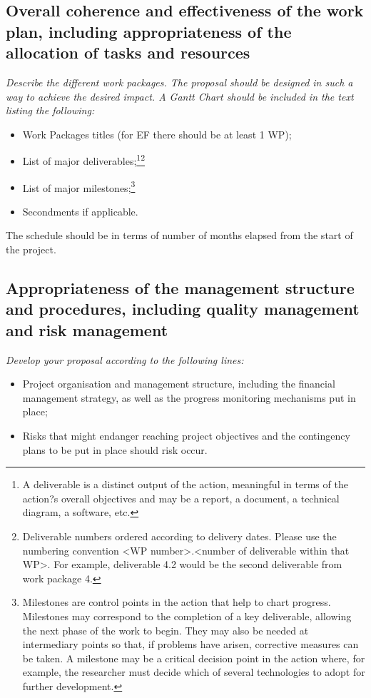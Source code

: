 \documentclass[a4paper,11pt]{article}
\begin{document}
\subsection{Overall coherence and effectiveness of the work plan, including appropriateness of the allocation of tasks and resources}

{\em
Describe the different work packages. The proposal should be designed in such a way to achieve the desired impact. A Gantt Chart should be included in the text listing the following:
\begin{itemize}
\item Work Packages titles (for EF there should be at least 1 WP);
\item List of major deliverables;\footnote{A deliverable is a distinct output of the action, meaningful in terms of the action?s overall objectives and may be a report, a document, a technical diagram, a software, etc.}\footnote{Deliverable numbers ordered according to delivery dates. Please use the numbering convention <WP number>.<number of deliverable within that WP>. For example, deliverable 4.2 would be the second deliverable from work package 4.}
\item List of major milestones;\footnote{Milestones are control points in the action that help to chart progress. Milestones may correspond to the completion of a key deliverable, allowing the next phase of the work to begin. They may also be needed at intermediary points so that, if problems have arisen, corrective measures can be taken. A milestone may be a critical decision point in the action where, for example, the researcher must decide which of several technologies to adopt for further development.}
\item Secondments if applicable.
\end{itemize}
The schedule should be in terms of number of months elapsed from the start of the project.
}

\subsection{Appropriateness of the management structure and procedures, including quality management and risk management}

{\em
Develop your proposal according to the following lines:
\begin{itemize}
\item Project organisation and management structure, including the financial management strategy, as well as the progress monitoring mechanisms put in place;
\item Risks that might endanger reaching project objectives and the contingency plans to be put in place should risk occur.
\end{itemize}
}
\end{document}
